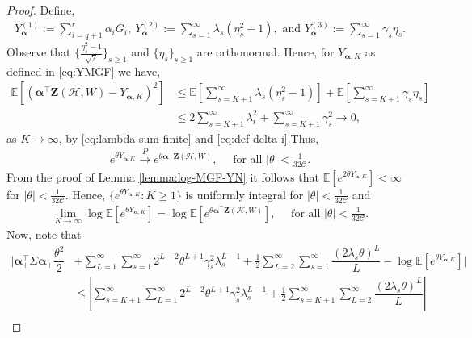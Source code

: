 \documentclass[11pt,reqno]{amsart}
\numberwithin{equation}{section}
\theoremstyle{definition}
\begin{document}
\begin{proof} Define,
\begin{align}\label{eq:YK}
    Y_{\bm \alpha}^{(1)} := \sum_{i=q+1}^{r}\alpha_{i}G_{i}, ~Y_{\bm \alpha}^{(2)} := \sum_{s=1}^{\infty}\lambda_{s}(\eta_{s}^{2}-1), \text{ and }  Y_{\bm \alpha}^{(3)} := \sum_{s=1}^{\infty} \gamma_s \eta_{s}.
\end{align}
Observe that $\{\frac{\eta_{s}^{2}-1}{\sqrt{2}}\}_{ s \geq 1 }$ and $\{\eta_{s}\}_{s \geq 1}$ are orthonormal. Hence, for $Y_{\bm \alpha, K}$ as defined in \eqref{eq:YMGF} we have, 
\begin{align*}
   \mathbb{E} [(\bm{\alpha}^{\top}\bm{Z}(\bm{\mathcal{H}},W) - Y_{\bm \alpha , K})^2] & \leq \mathbb{E} \left[\sum_{s=K+1}^{\infty}\lambda_{s}(\eta_{s}^{2}-1)\right] + \mathbb{E} \left[ \sum_{s=K+1}^{\infty}\gamma_{s}\eta_{s} \right] \nonumber \\
   & \leq 2\sum_{s=K+1}^{\infty}\lambda_{i}^{2} + \sum_{s=K+1}^{\infty}\gamma_{s}^{2} \rightarrow 0 , 
\end{align*}
as $K \rightarrow \infty$, by \eqref{eq:lambda-sum-finite} and \eqref{eq:def-delta-i}.Thus, 
\begin{align*}
    e^{\theta Y_{\bm \alpha , K} } \overset{P}{\rightarrow} e^{\theta \bm{\alpha}^{\top}\bm{Z}(\bm{\mathcal{H}},W)} , \quad \text{ for all }|\theta|<\frac{1}{32\mathcal{C}}. 
\end{align*} 
From the proof of Lemma \ref{lemma:log-MGF-YN} it follows that $\mathbb{E}[e^{2 \theta Y_{\bm \alpha , K} }] < \infty$ for $|\theta|<\frac{1}{32\mathcal{C}}$. Hence, $\{ e^{\theta Y_{\bm \alpha, K}} : K \geq 1\}$ is uniformly integral for $|\theta|<\frac{1}{32\mathcal{C}}$ and 
\begin{align}\label{eq:MGF-convg}
   \lim_{K \rightarrow \infty} \log\mathbb{E}\left[ e^{\theta Y_{\bm \alpha, K}} \right] = \log\mathbb{E}\left[ e^{\theta \bm{\alpha}^{\top}\bm{Z}(\bm{\mathcal{H}},W)} \right] , \quad \text{ for all } |\theta|<\frac{1}{32\mathcal{C}} . 
\end{align}
Now, note that 
\begin{align}\label{eq:logMGF-YN-convg-exp}
    \bigg|\bm{\alpha}_{+}^{\top}\Sigma\bm{\alpha}_{+}\dfrac{\theta^{2}}{2}
    & + \sum_{L = 1}^{\infty}\sum_{s=1}^{\infty}2^{L-2}\theta^{L+1}\gamma_{s}^{2}\lambda_{s}^{L-1}
     + \frac{1}{2}\sum_{L=2}^{\infty}\sum_{s=1}^{\infty}\dfrac{\left(2\lambda_{s}\theta\right)^{L}}{L} - \log\mathbb{E}\left[ e^{\theta Y_{\bm \alpha, K}} \right]\bigg|\nonumber\\
     &\leq \left|\sum_{s=K+1}^{\infty}\sum_{L = 1}^{\infty}2^{L-2}\theta^{L+1}\gamma_{s}^{2}\lambda_{s}^{L-1} + \frac{1}{2}\sum_{s=K+1}^{\infty}\sum_{L=2}^{\infty}\dfrac{\left(2\lambda_{s}\theta\right)^{L}}{L}\right|\nonumber\\ 

\end{align}
\end{proof}
\end{document}
